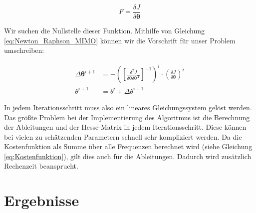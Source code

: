 \begin{equation}
	{F} = \frac{\delta J}{\delta \mathbf{\theta}}
	\label{eq:Newton_Raphson_1}
\end{equation}

Wir suchen die Nullstelle dieser Funktion. Mithilfe von Gleichung \ref{eq:Newton_Raphson_MIMO} können wir die Vorschrift für unser Problem umschreiben:

\begin{align}
	\Delta \mathbf{\theta}^{i+1} &= -\left(\left[  \frac{\delta^{2}J}{\delta \mathbf{\theta} \delta \mathbf{\theta^T}}\right]^{-1} \right)^{i} \cdot \left(\frac{\delta J}{\delta \mathbf{\theta}}\right)^{i} \nonumber \\
	\theta^{i+1} &= \theta^{i} + \Delta\theta^{i+1}
	\label{eq:Newton_Raphson_2}
\end{align}

In jedem Iterationsschritt muss also ein lineares Gleichungssystem gelöst werden. Das größte Problem bei der Implementierung des Algoritmus ist die Berechnung der Ableitungen und der Hesse-Matrix in jedem Iterationsschritt. Diese können bei vielen zu schätzenden Parametern schnell sehr kompliziert werden. Da die Kostenfunktion als Summe über alle Frequenzen berechnet wird (siehe Gleichung \ref{eq:Kostenfunktion}), gilt dies auch für die Ableitungen. Dadurch wird zusätzlich Rechenzeit beansprucht.  

\section{Ergebnisse}